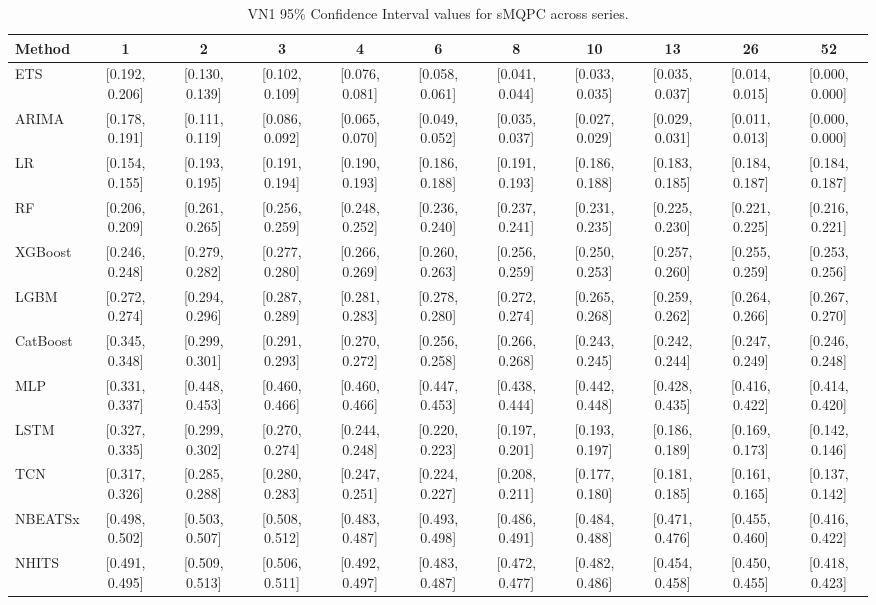 \begin{table}[!ht]
\centering
\begin{adjustbox}{max width=\textwidth}
\begin{tabular}{lcccccccccc}
\toprule
Method & 1 & 2 & 3 & 4 & 6 & 8 & 10 & 13 & 26 & 52 \\
\midrule
ETS & [0.192, 0.206] & [0.130, 0.139] & [0.102, 0.109] & [0.076, 0.081] & [0.058, 0.061] & [0.041, 0.044] & [0.033, 0.035] & [0.035, 0.037] & [0.014, 0.015] & [0.000, 0.000] \\
ARIMA & [0.178, 0.191] & [0.111, 0.119] & [0.086, 0.092] & [0.065, 0.070] & [0.049, 0.052] & [0.035, 0.037] & [0.027, 0.029] & [0.029, 0.031] & [0.011, 0.013] & [0.000, 0.000] \\
LR & [0.154, 0.155] & [0.193, 0.195] & [0.191, 0.194] & [0.190, 0.193] & [0.186, 0.188] & [0.191, 0.193] & [0.186, 0.188] & [0.183, 0.185] & [0.184, 0.187] & [0.184, 0.187] \\
RF & [0.206, 0.209] & [0.261, 0.265] & [0.256, 0.259] & [0.248, 0.252] & [0.236, 0.240] & [0.237, 0.241] & [0.231, 0.235] & [0.225, 0.230] & [0.221, 0.225] & [0.216, 0.221] \\
XGBoost & [0.246, 0.248] & [0.279, 0.282] & [0.277, 0.280] & [0.266, 0.269] & [0.260, 0.263] & [0.256, 0.259] & [0.250, 0.253] & [0.257, 0.260] & [0.255, 0.259] & [0.253, 0.256] \\
LGBM & [0.272, 0.274] & [0.294, 0.296] & [0.287, 0.289] & [0.281, 0.283] & [0.278, 0.280] & [0.272, 0.274] & [0.265, 0.268] & [0.259, 0.262] & [0.264, 0.266] & [0.267, 0.270] \\
CatBoost & [0.345, 0.348] & [0.299, 0.301] & [0.291, 0.293] & [0.270, 0.272] & [0.256, 0.258] & [0.266, 0.268] & [0.243, 0.245] & [0.242, 0.244] & [0.247, 0.249] & [0.246, 0.248] \\
MLP & [0.331, 0.337] & [0.448, 0.453] & [0.460, 0.466] & [0.460, 0.466] & [0.447, 0.453] & [0.438, 0.444] & [0.442, 0.448] & [0.428, 0.435] & [0.416, 0.422] & [0.414, 0.420] \\
LSTM & [0.327, 0.335] & [0.299, 0.302] & [0.270, 0.274] & [0.244, 0.248] & [0.220, 0.223] & [0.197, 0.201] & [0.193, 0.197] & [0.186, 0.189] & [0.169, 0.173] & [0.142, 0.146] \\
TCN & [0.317, 0.326] & [0.285, 0.288] & [0.280, 0.283] & [0.247, 0.251] & [0.224, 0.227] & [0.208, 0.211] & [0.177, 0.180] & [0.181, 0.185] & [0.161, 0.165] & [0.137, 0.142] \\
NBEATSx & [0.498, 0.502] & [0.503, 0.507] & [0.508, 0.512] & [0.483, 0.487] & [0.493, 0.498] & [0.486, 0.491] & [0.484, 0.488] & [0.471, 0.476] & [0.455, 0.460] & [0.416, 0.422] \\
NHITS & [0.491, 0.495] & [0.509, 0.513] & [0.506, 0.511] & [0.492, 0.497] & [0.483, 0.487] & [0.472, 0.477] & [0.482, 0.486] & [0.454, 0.458] & [0.450, 0.455] & [0.418, 0.423] \\
\bottomrule
\end{tabular}
\end{adjustbox}
\caption{VN1 95\% Confidence Interval values for sMQPC across series.}
\label{tab:ci_vn1_smqpc}
\end{table}

